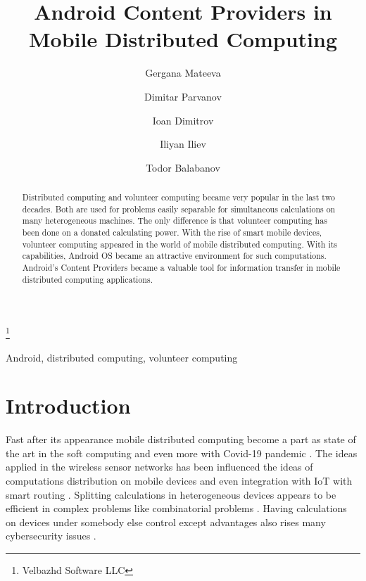 \documentclass{ifacconf}
\begin{document}
\begin{frontmatter}

\title{Android Content Providers in Mobile Distributed Computing } 

\thanks[footnoteinfo]{Velbazhd Software LLC}

\author[First]{Gergana Mateeva} 
\author[First]{Dimitar Parvanov} 
\author[Second]{Ioan Dimitrov} 
\author[First]{Iliyan Iliev}
\author[First]{Todor Balabanov} 

\address[First]{Bulgarian Academy of Sciences\\Institute of Information and Communication Technologies\\acad. Georgi Bonchev Str., block 2, 1113 Sofia, Bulgaria\\(gergana.mateeva, dimitar.parvanov, iliyan.iliev, todor.balabanov) @iict.bas.bg}
\address[Second]{Technical University of Sofia\\Faculty of Electronic Engineering and Technology\\8 St. Kliment Ohridski Blvd., block 1, 1756 Sofia, Bulgaria\\joancdimitrov@tu-sofia.bg}

\begin{abstract}
Distributed computing and volunteer computing became very popular in the last two decades. Both are used for problems easily separable for simultaneous calculations on many heterogeneous machines. The only difference is that volunteer computing has been done on a donated calculating power. With the rise of smart mobile devices, volunteer computing appeared in the world of mobile distributed computing. With its capabilities, Android OS became an attractive environment for such computations. Android's Content Providers became a valuable tool for information transfer in mobile distributed computing applications. 
\end{abstract}

\begin{keyword}
Android, distributed computing, volunteer computing
\end{keyword}

\end{frontmatter}

\section{Introduction}

Fast after its appearance mobile distributed computing \cite{Bibi-2021-a} become a part as state of the art in the soft computing \cite{Angelova-2009-a} and even more with Covid-19 pandemic \cite{Petrov-2021-a}. The ideas applied in the wireless sensor networks \cite{Alexandrov-2016-a} has been influenced the ideas of computations distribution on mobile devices and even integration with IoT \cite{Dineva-2019-a} with smart routing \cite{Tashev-2019-a}. Splitting calculations in heterogeneous devices \cite{Weinbub-2012-a} appears to be efficient in complex problems like combinatorial problems \cite{Borissova-2015-a}. Having calculations on devices under somebody else control \cite{Balabanov-2020-a} except advantages also rises many cybersecurity issues \cite{Dimitrov-2021-a}.
\end{document}
